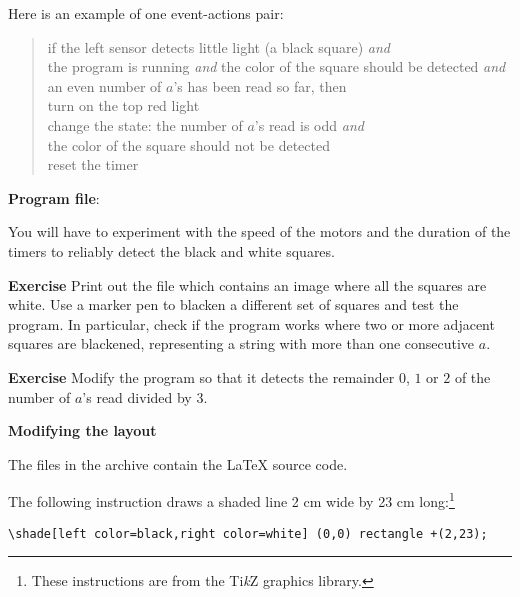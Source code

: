 Here is an example of one event-actions pair:


\begin{quote}
if the left sensor detects little light (a black square) \emph{and}\\
\hspace*{1em} the program is running \emph{and}
the color of the square should be detected \emph{and}\\
\hspace*{1em} an even number of $a$'s has been read so far, then\\
\hspace*{2em} turn on the top red light\\
\hspace*{2em} change the state: the number of $a$'s
read is odd \emph{and}\\
\hspace*{4em} the color of the square should not be detected\\
\hspace*{2em} reset the timer
\end{quote}

{\raggedleft \hfill \textbf{Program file}: }

You will have to experiment with the speed of the motors and the
duration of the timers to reliably detect the black and white squares.

\textbf{Exercise} Print out the file  which
contains an image where all the squares are white. Use a marker pen to
blacken a different set of squares and test the program. In particular,
check if the program works where two or more adjacent squares are
blackened, representing a string with more than one consecutive $a$.

\textbf{Exercise} Modify the program so that it detects the remainder
$0$, $1$ or $2$ of the number of $a$'s read divided by $3$.

\bigskip

\textbf{Modifying the layout}


The files  in the archive contain the
\LaTeX{} source code.

The following instruction draws a shaded line 2 cm wide by 23 cm
long:\footnote{These instructions are from the Ti\textit{k}Z
graphics library.}
\begin{footnotesize}
\begin{verbatim}
\shade[left color=black,right color=white] (0,0) rectangle +(2,23);
\end{verbatim}
\end{footnotesize}


